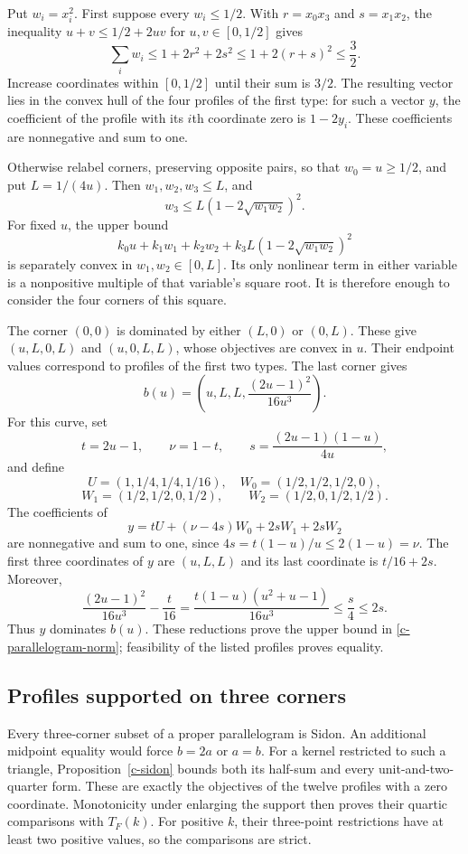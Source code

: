 Put $w_i=x_i^2$.  First suppose every $w_i\le1/2$.  With
$r=x_0x_3$ and $s=x_1x_2$, the inequality
$u+v\le1/2+2uv$ for $u,v\in[0,1/2]$ gives
\[
 \sum_iw_i\le1+2r^2+2s^2\le1+2(r+s)^2\le\frac32.
\]
Increase coordinates within $[0,1/2]$ until their sum is $3/2$.
The resulting vector lies in the convex hull of the four profiles of the
first type: for such a vector $y$, the coefficient of the profile with its
$i$th coordinate zero is $1-2y_i$.  These coefficients are nonnegative
and sum to one.

Otherwise relabel corners, preserving opposite pairs, so that $w_0=u\ge1/2$,
and put $L=1/(4u)$.  Then $w_1,w_2,w_3\le L$, and
\[
 w_3\le L\left(1-2\sqrt{w_1w_2}\right)^2.
\]
For fixed $u$, the upper bound
\[
 k_0u+k_1w_1+k_2w_2
       +k_3L\left(1-2\sqrt{w_1w_2}\right)^2
\]
is separately convex in $w_1,w_2\in[0,L]$.  Its only nonlinear term in
either variable is a nonpositive multiple of that variable's square root.
It is therefore enough to consider the four corners of this square.

The corner $(0,0)$ is dominated by either $(L,0)$ or $(0,L)$.  These
give $(u,L,0,L)$ and $(u,0,L,L)$, whose objectives are convex in $u$.
Their endpoint values correspond to profiles of the first two types.
The last corner gives
\[
 b(u)=\left(u,L,L,\frac{(2u-1)^2}{16u^3}\right).
\]
For this curve, set
\[
 t=2u-1,\qquad \nu=1-t,\qquad
 s=\frac{(2u-1)(1-u)}{4u},
\]
and define
\[
 U=(1,1/4,1/4,1/16),\quad W_0=(1/2,1/2,1/2,0),
\]
\[
 W_1=(1/2,1/2,0,1/2),\qquad W_2=(1/2,0,1/2,1/2).
\]
The coefficients of
\[
 y=tU+(\nu-4s)W_0+2sW_1+2sW_2
\]
are nonnegative and sum to one, since $4s=t(1-u)/u\le2(1-u)=\nu$.
The first three coordinates of $y$ are $(u,L,L)$ and its last coordinate
is $t/16+2s$.  Moreover,
\[
 \frac{(2u-1)^2}{16u^3}-\frac t{16}
 =\frac{t(1-u)(u^2+u-1)}{16u^3}
 \le\frac s4\le2s.
\]
Thus $y$ dominates $b(u)$.  These reductions prove the upper bound in
\eqref{c-parallelogram-norm}; feasibility of the listed profiles proves
equality.

\subsection{Profiles supported on three corners}

Every three-corner subset of a proper parallelogram is Sidon.  An additional
midpoint equality would force $b=2a$ or $a=b$.  For a kernel restricted to
such a triangle, Proposition~\ref{c-sidon} bounds both its half-sum and every
unit-and-two-quarter form.  These are exactly the objectives of the twelve
profiles with a zero coordinate.  Monotonicity under enlarging the support
then proves their quartic comparisons with $T_F(k)$.  For positive $k$,
their three-point restrictions have at least two positive values, so the
comparisons are strict.

